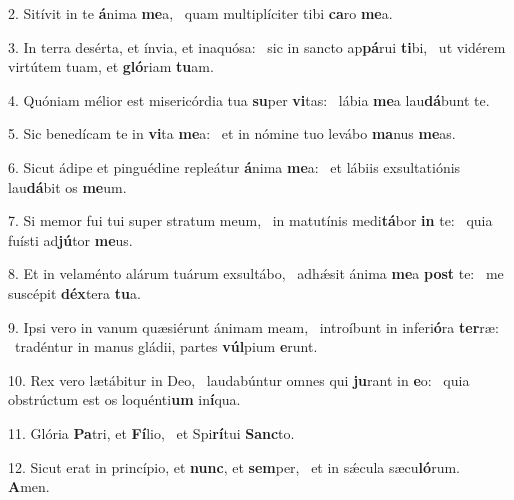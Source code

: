 2. Sitívit in te \textbf{á}nima \textbf{me}a, \ast\  quam multiplíciter tibi \textbf{ca}ro \textbf{me}a.\

3. In terra desérta, et ínvia, et inaquósa: \dag\  sic in sancto ap\textbf{pá}rui \textbf{ti}bi, \ast\  ut vidérem virtútem tuam, et \textbf{gló}riam \textbf{tu}am.\

4. Quóniam mélior est misericórdia tua \textbf{su}per \textbf{vi}tas: \ast\  lábia \textbf{me}a lau\textbf{dá}bunt te.\

5. Sic benedícam te in \textbf{vi}ta \textbf{me}a: \ast\  et in nómine tuo levábo \textbf{ma}nus \textbf{me}as.\

6. Sicut ádipe et pinguédine repleátur \textbf{á}nima \textbf{me}a: \ast\  et lábiis exsultatiónis lau\textbf{dá}bit os \textbf{me}um.\

7. Si memor fui tui super stratum meum, \dag\  in matutínis medi\textbf{tá}bor \textbf{in} te: \ast\  quia fuísti ad\textbf{jú}tor \textbf{me}us.\

8. Et in velaménto alárum tuárum exsultábo, \dag\  adhǽsit ánima \textbf{me}a \textbf{post} te: \ast\  me suscépit \textbf{déx}tera \textbf{tu}a.\

9. Ipsi vero in vanum quæsiérunt ánimam meam, \dag\  introíbunt in inferi\textbf{ó}ra \textbf{ter}ræ: \ast\  tradéntur in manus gládii, partes \textbf{vúl}pium \textbf{e}runt.\

10. Rex vero lætábitur in Deo, \dag\  laudabúntur omnes qui \textbf{ju}rant in \textbf{e}o: \ast\  quia obstrúctum est os loquénti\textbf{um} in\textbf{í}qua.\

11. Glória \textbf{Pa}tri, et \textbf{Fí}lio, \ast\  et Spi\textbf{rí}tui \textbf{Sanc}to.\

12. Sicut erat in princípio, et \textbf{nunc}, et \textbf{sem}per, \ast\  et in sǽcula sæcu\textbf{ló}rum. \textbf{A}men.\


